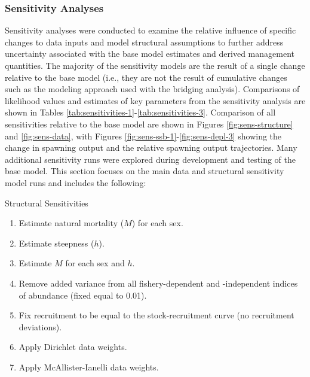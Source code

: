 \documentclass[11pt,
  english,
  letterpaper,
]{article}
\begin{document}
\hypertarget{sensitivity-analyses}{%
\subsubsection{Sensitivity Analyses}\label{sensitivity-analyses}}

Sensitivity analyses were conducted to examine the relative influence of specific changes to data inputs and model structural assumptions to further address uncertainty associated with the base model estimates and derived management quantities. The majority of the sensitivity models are the result of a single change relative to the base model (i.e., they are not the result of cumulative changes such as the modeling approach used with the bridging analysis). Comparisons of likelihood values and estimates of key parameters from the sensitivity analysis are shown in Tables \ref{tab:sensitivities-1}-\ref{tab:sensitivities-3}. Comparison of all sensitivities relative to the base model are shown in Figures \ref{fig:sens-structure} and \ref{fig:sens-data}, with Figures \ref{fig:sens-ssb-1}-\ref{fig:sens-depl-3} showing the change in spawning output and the relative spawning output trajectories. Many additional sensitivity runs were explored during development and testing of the base model. This section focuses on the main data and structural sensitivity model runs and includes the following:

Structural Sensitivities

\begin{enumerate}
   
  \item  Estimate natural mortality ($M$) for each sex.
  
  \item Estimate steepness ($h$).
  
  \item Estimate $M$ for each sex and $h$.
  
  \item Remove added variance from all fishery-dependent and -independent indices of abundance (fixed equal to 0.01).
  
  \item Fix recruitment to be equal to the stock-recruitment curve (no recruitment deviations).
  
  \item Apply Dirichlet data weights.
  
  \item Apply McAllister-Ianelli data weights.

\end{enumerate}
\end{document}
